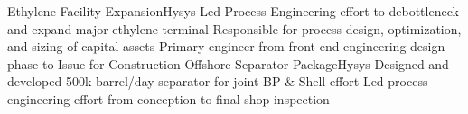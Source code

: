 %
%
%
%
%
\justifiedsubsection%
%
{Ethylene Facility Expansion}{Hysys}
%
\workitemsThree%
%
{Led Process Engineering effort to debottleneck and expand major ethylene terminal}
{Responsible for process design, optimization, and sizing of capital assets}
{Primary engineer from front-end engineering design phase to Issue for Construction}
%
%
%
%
\justifiedsubsection%
%
{Offshore Separator Package}{Hysys}
%
\workitemsTwo%
%
{Designed and developed 500k barrel/day separator for joint BP \& Shell effort}
{Led process engineering effort from conception to final shop inspection}
%
%
%
%